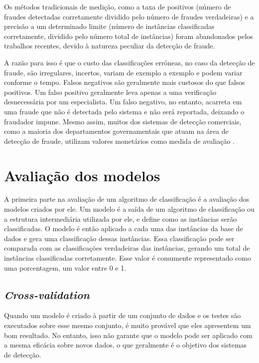 Os métodos tradicionais de medição, como a taxa de positivos (número de fraudes detectadas corretamente dividido pelo número de fraudes verdadeiras) e a precisão a um determinado limite (número de instâncias classificadas corretamente, dividido pelo número total de instâncias) foram abandonados pelos trabalhos recentes, devido à natureza peculiar da detecção de fraude.

A razão para isso é que o custo das classificações errôneas, no caso da detecção de fraude, são irregulares, incertos, variam de exemplo a exemplo e podem variar conforme o tempo. Falsos negativos são geralmente mais custosos do que falsos positivos. Um falso positivo geralmente leva apenas a uma verificação desnecessária por um especialista. Um falso negativo, no entanto, acarreta em uma fraude que não é detectada pelo sistema e não será reportada, deixando o fraudador impune. Mesmo assim, muitos dos sistemas de detecção comerciais, como a maioria dos departamentos governamentais que atuam na área de detecção de fraude, utilizam valores monetários como medida de avaliação \cite{Phua2010}.

\section{Avaliação dos modelos}

A primeira parte na avaliação de um algoritmo de classificação é a avaliação dos modelos criados por ele. Um modelo é a saída de um algoritmo de classificação ou a estrutura intermediária utilizada por ele, e define como as instâncias serão classificadas. O modelo é então aplicado a cada uma das instâncias da base de dados e gera uma classificação dessas instâncias. Essa classificação pode ser comparada com as classificações verdadeiras das instâncias, gerando um total de instâncias classificadas corretamente. Esse valor é comumente representado como uma porcentagem, um valor entre 0 e 1.

\subsection{\emph{Cross-validation}}
\label{sec:eval_cross_validation}

Quando um modelo é criado à partir de um conjunto de dados e os testes são executados sobre esse mesmo conjunto, é muito provável que eles apresentem um bom resultado. No entanto, isso não garante que o modelo pode ser aplicado com a mesma eficácia sobre novos dados, o que geralmente é o objetivo dos sistemas de detecção.

